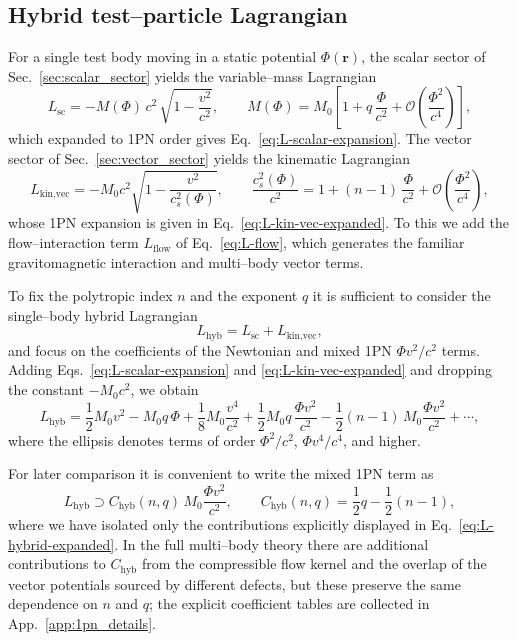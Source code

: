 \documentclass[11pt]{article}
\begin{document}
\subsection{Hybrid test--particle Lagrangian}
\label{subsec:hybrid-Lagrangian}

For a single test body moving in a static potential \(\Phi(\mathbf{r})\),
the scalar sector of Sec.~\ref{sec:scalar_sector} yields the variable--mass
Lagrangian
\begin{equation}
  L_{\text{sc}}
  = -M(\Phi)\,c^2\,\sqrt{1 - \frac{v^2}{c^2}},
  \qquad
  M(\Phi) = M_0\left[ 1 + q\,\frac{\Phi}{c^2}
    + \mathcal{O}\!\left( \frac{\Phi^2}{c^4} \right) \right],
  \label{eq:L-sc-recall}
\end{equation}
which expanded to 1PN order gives Eq.~\eqref{eq:L-scalar-expansion}.  The
vector sector of Sec.~\ref{sec:vector_sector} yields the kinematic
Lagrangian
\begin{equation}
  L_{\text{kin,vec}}
  = -M_0 c^2 \sqrt{1 - \frac{v^2}{c_s^2(\Phi)}},
  \qquad
  \frac{c_s^2(\Phi)}{c^2}
  = 1 + (n-1)\,\frac{\Phi}{c^2}
    + \mathcal{O}\!\left( \frac{\Phi^2}{c^4} \right),
  \label{eq:L-vec-recall}
\end{equation}
whose 1PN expansion is given in Eq.~\eqref{eq:L-kin-vec-expanded}.  To this
we add the flow--interaction term \(L_{\text{flow}}\) of
Eq.~\eqref{eq:L-flow}, which generates the familiar gravitomagnetic
interaction and multi--body vector terms.

To fix the polytropic index \(n\) and the exponent \(q\) it is sufficient to
consider the single--body hybrid Lagrangian
\begin{equation}
  L_{\text{hyb}}
  = L_{\text{sc}} + L_{\text{kin,vec}},
  \label{eq:L-hybrid-def}
\end{equation}
and focus on the coefficients of the Newtonian and mixed 1PN
\(\Phi v^2/c^2\) terms.  Adding
Eqs.~\eqref{eq:L-scalar-expansion} and \eqref{eq:L-kin-vec-expanded} and
dropping the constant \(-M_0 c^2\), we obtain
\begin{equation}
  L_{\text{hyb}}
  = \frac{1}{2} M_0 v^2
    - M_0 q\,\Phi
    + \frac{1}{8} M_0 \frac{v^4}{c^2}
    + \frac{1}{2} M_0 q\,\frac{\Phi v^2}{c^2}
    - \frac{1}{2} (n-1)\,M_0 \frac{\Phi v^2}{c^2}
    + \cdots,
  \label{eq:L-hybrid-expanded}
\end{equation}
where the ellipsis denotes terms of order
\(\Phi^2/c^2\), \(\Phi v^4/c^4\), and higher.

For later comparison it is convenient to write the mixed 1PN term as
\begin{equation}
  L_{\text{hyb}} \supset
  C_{\text{hyb}}(n,q)\,M_0 \frac{\Phi v^2}{c^2},
  \qquad
  C_{\text{hyb}}(n,q)
  = \frac{1}{2} q - \frac{1}{2}(n-1),
  \label{eq:C-hyb-def}
\end{equation}
where we have isolated only the contributions explicitly displayed in
Eq.~\eqref{eq:L-hybrid-expanded}.  In the full multi--body theory there are
additional contributions to \(C_{\text{hyb}}\) from the compressible flow
kernel and the overlap of the vector potentials sourced by different
defects, but these preserve the same dependence on \(n\) and \(q\); the
explicit coefficient tables are collected in
App.~\ref{app:1pn_details}.
\end{document}
